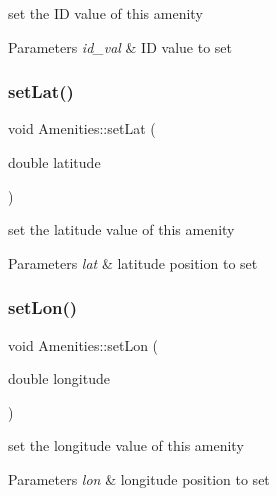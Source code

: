 set the ID value of this amenity 
\begin{DoxyParams}{Parameters}
{\em id\+\_\+val} & ID value to set \\
\hline
\end{DoxyParams}
\mbox{\label{class_amenities_ae32b353ad67e770da79a4aefc493cf6b}} 
\subsubsection{\texorpdfstring{set\+Lat()}{setLat()}}
{\footnotesize\ttfamily void Amenities\+::set\+Lat (\begin{DoxyParamCaption}\item[{double}]{latitude }\end{DoxyParamCaption})\hspace{0.3cm}{\ttfamily [inline]}}

set the latitude value of this amenity 
\begin{DoxyParams}{Parameters}
{\em lat} & latitude position to set \\
\hline
\end{DoxyParams}
\mbox{\label{class_amenities_a4452e6a8ec7e1f4d7b84307a75572ce2}} 
\subsubsection{\texorpdfstring{set\+Lon()}{setLon()}}
{\footnotesize\ttfamily void Amenities\+::set\+Lon (\begin{DoxyParamCaption}\item[{double}]{longitude }\end{DoxyParamCaption})\hspace{0.3cm}{\ttfamily [inline]}}

set the longitude value of this amenity 
\begin{DoxyParams}{Parameters}
{\em lon} & longitude position to set \\
\hline
\end{DoxyParams}
\mbox{\label{class_amenities_a71fd6a4f051daf3365b6dd78c4ef7ea6}} 
